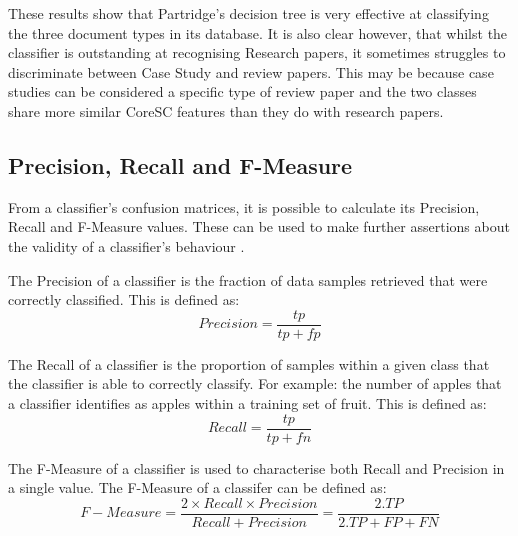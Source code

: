 These results show that Partridge's decision tree is very effective at
classifying the three document types in its database. It is also clear however,
that whilst the classifier is outstanding at recognising Research papers, it
sometimes struggles to discriminate between Case Study and review papers. This
may be because case studies can be considered a specific type of review paper
and the two classes share more similar CoreSC features than they do with
research papers.  

\subsection{ Precision, Recall and F-Measure }

From a classifier's confusion matrices, it is possible to calculate its
Precision, Recall and F-Measure values. These can be used to make further
assertions about the validity of a classifier's behaviour
\cite{witten2005data}.

The Precision of a classifier is the fraction of data samples retrieved that
were correctly classified. This is defined as:
\[Precision = \frac{tp}{tp+fp} \]

The Recall of a classifier is the proportion of samples within a given class
that the classifier is able to correctly classify. For example: the number of
apples that a classifier identifies as apples within a training set of fruit.
This is defined as:
\[Recall = \frac{tp}{tp+fn} \]

The F-Measure of a classifier is used to characterise both Recall and Precision
in a single value. The F-Measure of a classifer can be defined as:
\[
F-Measure = \frac{ 2 \times Recall \times Precision} { Recall + Precision } = 
\frac{2 . TP}{ 2 . TP + FP + FN }
\]


